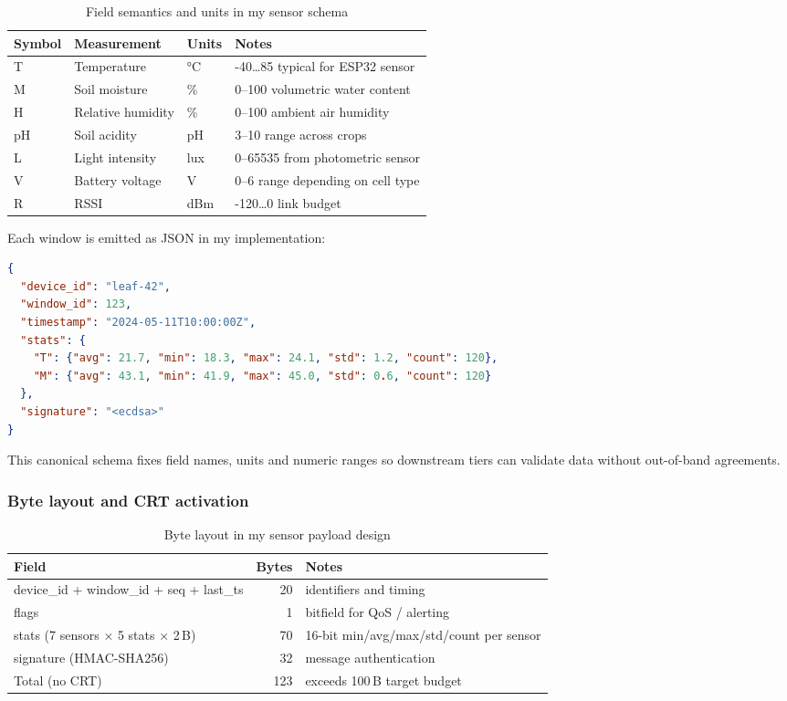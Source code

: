 \documentclass[12pt]{article}
\begin{document}
\begin{table}[H]
\centering
\caption{Field semantics and units in my sensor schema}
\begin{tabular}{|l|l|l|l|}
\hline
Symbol & Measurement & Units & Notes \\
\hline
T & Temperature & °C & -40…85 typical for ESP32 sensor \\
M & Soil moisture & \% & 0–100 volumetric water content \\
H & Relative humidity & \% & 0–100 ambient air humidity \\
pH & Soil acidity & pH & 3–10 range across crops \\
L & Light intensity & lux & 0–65535 from photometric sensor \\
V & Battery voltage & V & 0–6 range depending on cell type \\
R & RSSI & dBm & -120…0 link budget \\
\hline
\end{tabular}
\end{table}

Each window is emitted as JSON in my implementation:

\begin{lstlisting}[language=json, basicstyle=\footnotesize\ttfamily]
{
  "device_id": "leaf-42",
  "window_id": 123,
  "timestamp": "2024-05-11T10:00:00Z",
  "stats": {
    "T": {"avg": 21.7, "min": 18.3, "max": 24.1, "std": 1.2, "count": 120},
    "M": {"avg": 43.1, "min": 41.9, "max": 45.0, "std": 0.6, "count": 120}
  },
  "signature": "<ecdsa>"
}
\end{lstlisting}

This canonical schema fixes field names, units and numeric ranges so downstream tiers can validate data without out-of-band agreements.

\subsubsection{Byte layout and CRT activation}

\begin{table}[H]
\centering
\caption{Byte layout in my sensor payload design}
\begin{tabular}{|l|r|l|}
\hline
Field & Bytes & Notes \\
\hline
device\_id + window\_id + seq + last\_ts & 20 & identifiers and timing \\
flags & 1 & bitfield for QoS / alerting \\
stats (7 sensors × 5 stats × 2 B) & 70 & 16-bit min/avg/max/std/count per sensor \\
signature (HMAC-SHA256) & 32 & message authentication \\
\hline
Total (no CRT) & 123 & exceeds 100 B target budget \\
\hline
\end{tabular}
\end{table}
\end{document}
